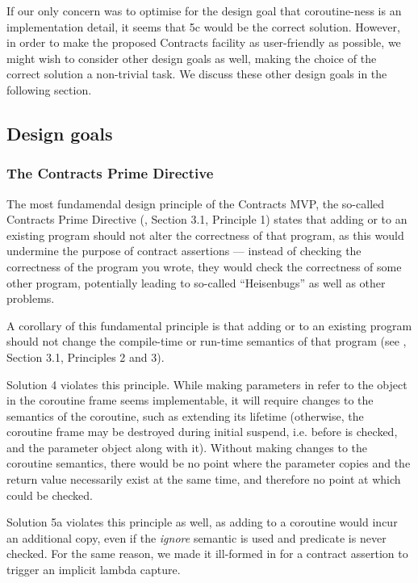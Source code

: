 If our only concern was to optimise for the design goal that coroutine-ness is an implementation detail, it seems that 5c would be the correct solution. However, in order to make the proposed Contracts facility as user-friendly as possible, we might wish to consider other design goals as well, making the choice of the correct solution a non-trivial task. We discuss these other design goals in the following section.

\subsection{Design goals}

\subsubsection{The Contracts Prime Directive}

The most fundamendal design principle of the Contracts MVP, the so-called Contracts Prime Directive (\cite{P2900R8}, Section 3.1, Principle 1) states that adding  or  to an existing program should not alter the correctness of that program, as this would undermine the purpose of contract assertions --- instead of checking the correctness of the program you wrote, they would check the correctness of some other program, potentially leading to so-called ``Heisenbugs'' as well as other problems.

A corollary of this fundamental principle is that adding  or  to an existing program should not change the compile-time or run-time semantics of that program (see \cite{P2900R8}, Section 3.1, Principles 2 and 3).

Solution 4 violates this principle. While making parameters in  refer to the object in the coroutine frame seems implementable, it will require changes to the semantics of the coroutine, such as extending its lifetime (otherwise, the coroutine frame may be destroyed during initial suspend, i.e. before  is checked, and the parameter object along with it). Without making changes to the coroutine semantics, there would be no point where the parameter copies and the return value necessarily exist at the same time, and therefore no point at which  could be checked.

Solution 5a violates this principle as well, as adding  to a coroutine would incur an additional copy, even if the \emph{ignore} semantic is used and predicate is never checked. For the same reason, we made it ill-formed in \cite{P2900R8} for a contract assertion to trigger an implicit lambda capture.

